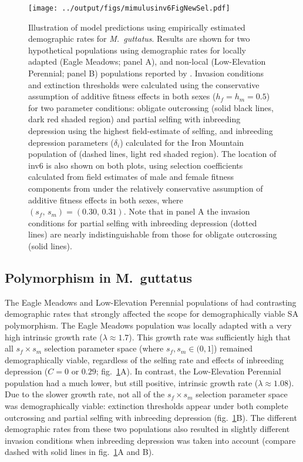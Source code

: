 \documentclass[11pt]{article}
\begin{document}
\begin{figure}[htbp]
 \centering
 \texttt{[image: ../output/figs/mimulusinv6FigNewSel.pdf]}
 \caption{\footnotesize{Illustration of model predictions using empirically estimated demographic rates for {\itshape M.~guttatus}. Results are shown for two hypothetical populations using demographic rates for locally adapted (Eagle Meadows; panel A), and non-local (Low-Elevation Perennial; panel B) populations reported by \citet{PetersonEtAl2016}. Invasion conditions and extinction thresholds were calculated using the conservative assumption of additive fitness effects in both sexes ($h_f = h_m = 0.5$) for two parameter conditions: obligate outcrossing (solid black lines, dark red shaded region)  and partial selfing with inbreeding depression using the highest field-estimate of selfing, and inbreeding depression parameters ($\delta_i$) calculated for the Iron Mountain population of \citet{Willis1993} (dashed lines, light red shaded region). The location of inv6 is also shown on both plots, using selection coefficients calculated from field estimates of male and female fitness components from \citet{LeeKelly2015} under the relatively conservative assumption of additive fitness effects in both sexes, where $(s_f,\,s_m) = (0.30,\, 0.31)$. Note that in panel A the invasion conditions for partial selfing with inbreeding depression (dotted lines) are nearly indistinguishable from those for obligate outcrossing (solid lines).}} 
 \label{fig:mimulusFig}
 \end{figure}

\subsection*{Polymorphism in M.~guttatus} \label{sec:Mgutt}

The Eagle Meadows and Low-Elevation Perennial populations of \citet{PetersonEtAl2016} had contrasting demographic rates that strongly affected the scope for demographically viable SA polymorphism. The Eagle Meadows population was locally adapted with a very high intrinsic growth rate ($\lambda \approx 1.7$). This growth rate was sufficiently high that all $s_f \times s_m$ selection parameter space (where $s_f, s_m \in (0,1]$) remained demographically viable, regardless of the selfing rate and effects of inbreeding depression ($C = 0$ or $0.29$; fig.~\ref{fig:mimulusFig}A). In contrast, the Low-Elevation Perennial population had a much lower, but still positive, intrinsic growth rate ($\lambda \approx 1.08$). Due to the slower growth rate, not all of the $s_f \times s_m$ selection parameter space was demographically viable: extinction thresholds appear under both complete outcrossing and partial selfing with inbreeding depression (fig.~\ref{fig:mimulusFig}B). The different demographic rates from these two populations also resulted in slightly different invasion conditions when inbreeding depression was taken into account (compare dashed with solid lines in fig.~\ref{fig:mimulusFig}A and B).
\end{document}
